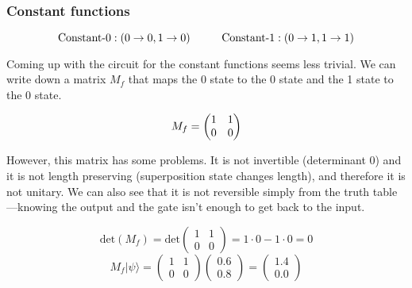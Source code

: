 \documentclass[12pt, letterpaper]{article}
\begin{document}
\subsubsection{Constant functions}
\vspace{2 mm}
$$\text{Constant-}0 : (0 \rightarrow 0,  1 \rightarrow 0)
\hspace{1 cm}
\text{Constant-}1 : (0 \rightarrow 1,  1 \rightarrow 1) \vspace{2 mm}$$

\noindent
Coming up with the circuit for the constant functions seems less trivial. We can write down a matrix $M_f$ that maps the 0 state to the 0 state and the 1 state to the 0 state.\vspace{1 mm}

\begin{equation}
M_f = \left(\begin{matrix}
    1 & 1 \\
    0 & 0
\end{matrix}\right) \vspace{3 mm}
\end{equation}

\noindent
However, this matrix has some problems. It is not invertible (determinant 0) and it is not length preserving (superposition state changes length), and therefore it is not unitary. We can also see that it is not reversible simply from the truth table—knowing the output and the gate isn’t enough to get back to the input.\vspace{1 mm}

\begin{equation}
\text{det}(M_f) = \text{det}\left(\begin{matrix}
    1 & 1 \\
    0 & 0
\end{matrix}\right) = 1\cdot0 - 1\cdot0 = 0
\end{equation}
\vspace{3 mm}
\begin{equation}
M_f|\psi\rangle = \left(\begin{matrix}
    1 & 1 \\
    0 & 0
\end{matrix}\right)
\left(\begin{matrix}
    0.6 \\
    0.8
\end{matrix}\right) =
\left(\begin{matrix}
    1.4 \\
    0.0
\end{matrix}\right)
\end{equation}
\end{document}

